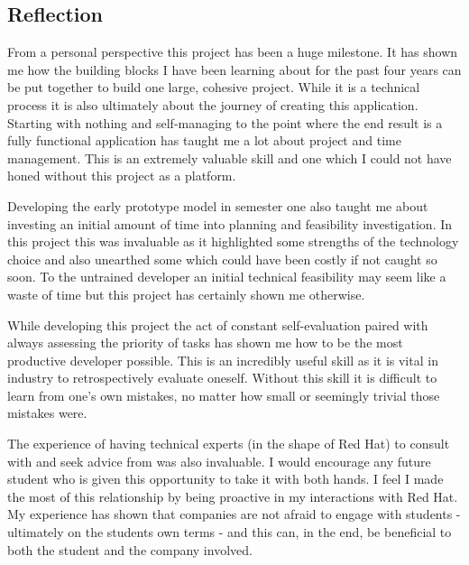 \subsection{Reflection}
From a personal perspective this project has been a huge milestone. It has shown me how the building blocks I have been learning about for the past four years can be put together to build one large, cohesive project. While it is a technical process it is also ultimately about the journey of creating this application. Starting with nothing and self-managing to the point where the end result is a fully functional application has taught me a lot about project and time management. This is an extremely valuable skill and one which I could not have honed without this project as a platform.

Developing the early prototype model in semester one also taught me about investing an initial amount of time into planning and feasibility investigation. In this project this was invaluable as it highlighted some strengths of the technology choice and also unearthed some which could have been costly if not caught so soon. To the untrained developer an initial technical feasibility may seem like a waste of time but this project has certainly shown me otherwise. 

While developing this project the act of constant self-evaluation paired with always assessing the priority of tasks has shown me how to be the most productive developer possible. This is an incredibly useful skill as it is vital in industry to retrospectively evaluate oneself. Without this skill it is difficult to learn from one's own mistakes, no matter how small or seemingly trivial those mistakes were.

The experience of having technical experts (in the shape of Red Hat) to consult with and seek advice from was also invaluable. I would encourage any future student who is given this opportunity to take it with both hands. I feel I made the most of this relationship by being proactive in my interactions with Red Hat. My experience has shown that companies are not afraid to engage with students - ultimately on the students own terms - and this can, in the end, be beneficial to both the student and the company involved.

